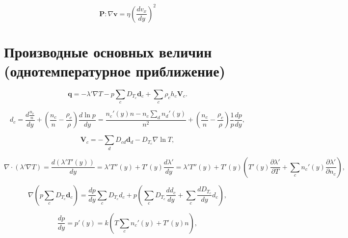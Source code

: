 \documentclass[12pt]{article}
\begin{document}
\begin{equation}
  \mathbf{P} : \nabla \mathbf{v} = \eta \left(\frac{d v_{x}}{d y} \right)^2
\end{equation}


\section{Производные основных величин (однотемпературное приближение)}

\begin{equation}
  \mathbf{q} = -\lambda' \nabla T - p \sum_{c} D_{T_{c}} \mathbf{d}_{c} + \sum_{c} \rho_{c} h_{c} \mathbf{V}_{c}.
\end{equation}

\begin{equation}
  d_{c} = \frac{d \frac{n_{c}}{n}}{d y} + \left(\frac{n_{c}}{n} - \frac{\rho_{c}}{\rho} \right) \frac{d \ln p}{d y} =
  \frac{n_{c}'(y)n - n_{c}\sum_{d}n_{d}'(y)}{n^2} + \left(\frac{n_{c}}{n} - \frac{\rho_{c}}{\rho} \right)\frac{1}{p} \frac{d p}{d y},
\end{equation}

\begin{equation}
  \mathbf{V}_{c} = -\sum_{d}D_{cd}\mathbf{d}_{d} - D_{T_{c}}\nabla \ln T,
\end{equation}

\begin{equation}
  \nabla \cdot (\lambda' \nabla T) = \frac{d (\lambda' T'(y))}{dy} = \lambda' T''(y) + T'(y) \frac{d \lambda'}{d y} = \lambda' T''(y) + T'(y) \left(T'(y) \frac{\partial \lambda'}{\partial T} + \sum_{c} n_{c}'(y) \frac{\partial \lambda'}{\partial n_{c}} \right),\label{d-lambda-nabla-T}
\end{equation}

\begin{equation}
  \nabla \left(p \sum_{c} D_{T_{c}} \mathbf{d}_{c} \right) = \frac{d p}{d y} \sum_{c} D_{T_{c}} d_{c} + p \left(\sum_{c} D_{T_{c}} \frac{d d_{c}}{d y} + \sum_{c} \frac{d D_{T_{c}}}{d y} d_{c} \right),
\end{equation}

\begin{equation}
  \frac{d p}{d y} = p'(y) = k \left(T\sum_{c} n_{c}'(y) +  T'(y)n \right),
\end{equation}
\end{document}
